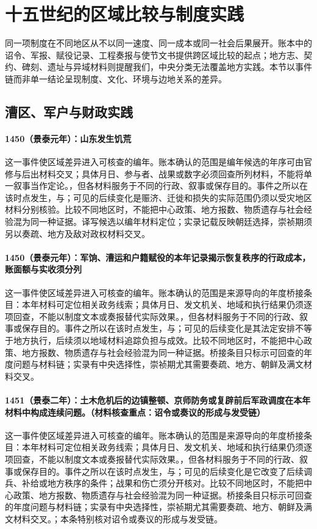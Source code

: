 \section{十五世纪的区域比较与制度实践}

同一项制度在不同地区从不以同一速度、同一成本或同一社会后果展开。账本中的诏令、军报、赋役记录、工程奏报与使节文书提供跨区域比较的起点；地方志、契约、碑刻、遗址与异域材料则提醒我们，中央分类无法覆盖地方实践。本节以事件链而非单一结论呈现制度、文化、环境与边地关系的差异。

\subsection{漕区、军户与财政实践}

\paragraph{1450（景泰元年）：山东发生饥荒} 这一事件使区域差异进入可核查的编年。账本确认的范围是编年候选的年序可由官修与后出材料交叉；具体月日、参与者、战果或数字必须回查所列材料，不能将单一叙事当作定论。，但各材料服务于不同的行政、叙事或保存目的。事件之所以在该时点发生，与；可见的后续变化是赈济、迁徙和损失的实际范围仍须以受灾地区材料分别核验。比较不同地区时，不能把中心政策、地方报数、物质遗存与社会经验混为同一种证据。译写候选以编年材料定位；实录记载反映朝廷选择，崇祯期须另以奏疏、地方及敌对政权材料交叉。

\paragraph{1450（景泰元年）：军饷、漕运和户籍赋役的本年记录揭示恢复秩序的行政成本，账面额与实收须分列} 这一事件使区域差异进入可核查的编年。账本确认的范围是来源导向的年度桥接条目：本年材料可定位相关政务线索；具体月日、发文机关、地域和执行结果仍须逐项回查，不能以制度文本或奏报替代实际效果。，但各材料服务于不同的行政、叙事或保存目的。事件之所以在该时点发生，与；可见的后续变化是其法定安排不等于地方执行，后续须以地域材料追踪负担与成效。比较不同地区时，不能把中心政策、地方报数、物质遗存与社会经验混为同一种证据。桥接条目只标示可回查的年度问题与材料链；实录有中央选择性，崇祯期尤其需要奏疏、地方、朝鲜及满文材料交叉。

\paragraph{1451（景泰二年）：土木危机后的边镇整顿、京师防务或复辟前后军政调度在本年材料中构成连续问题。（材料核查重点：诏令或奏议的形成与发受链）} 这一事件使区域差异进入可核查的编年。账本确认的范围是来源导向的年度桥接条目：本年材料可定位相关政务线索；具体月日、发文机关、地域和执行结果仍须逐项回查，不能以制度文本或奏报替代实际效果。，但各材料服务于不同的行政、叙事或保存目的。事件之所以在该时点发生，与；可见的后续变化是它改变了后续调兵、补给或地方秩序的条件；战果和伤亡须分开核对。比较不同地区时，不能把中心政策、地方报数、物质遗存与社会经验混为同一种证据。桥接条目只标示可回查的年度问题与材料链；实录有中央选择性，崇祯期尤其需要奏疏、地方、朝鲜及满文材料交叉。；本条特别核对诏令或奏议的形成与发受链。

